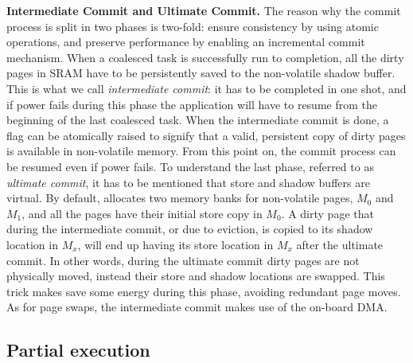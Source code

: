 \textbf{Intermediate Commit and Ultimate Commit.} The reason why the commit process is split in two phases is two-fold: ensure consistency by using atomic operations, and preserve performance by enabling an incremental commit mechanism. When a coalesced task is successfully run to completion, all the dirty pages in SRAM have to be persistently saved to the non-volatile shadow buffer. This is what we call \emph{intermediate commit}: it has to be completed in one shot, and if power fails during this phase the application will have to resume from the beginning of the last coalesced task. When the intermediate commit is done, a flag can be atomically raised to signify that a valid, persistent copy of dirty pages is available in non-volatile memory. From this point on, the commit process can be resumed even if power fails.
To understand the last phase, referred to as \emph{ultimate commit}, it has to be mentioned that store and shadow buffers are virtual. By default, \sys allocates two memory banks for non-volatile pages, $M_0$ and $M_1$, and all the pages have their initial store copy in $M_0$. A dirty page that during the intermediate commit, or due to eviction, is copied to its shadow location in $M_x$, will end up having its store location in $M_x$ after the ultimate commit. In other words, during the ultimate commit dirty pages are not physically moved, instead their store and shadow locations are swapped. This trick makes \sys save some energy during this phase, avoiding redundant page moves. As for page swaps, the intermediate commit makes use of the on-board DMA.

\subsection{Partial execution}

